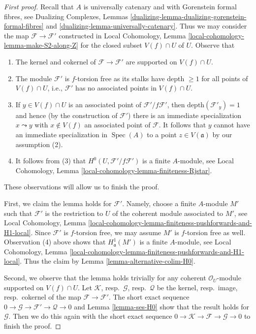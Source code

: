\documentclass{stacks-project}
\theoremstyle{plain}
\theoremstyle{definition}
\theoremstyle{remark}
\numberwithin{equation}{subsection}
\def\Spec{\mathop{\mathrm{Spec}}}
\begin{document}
\begin{proof}[First proof]
Recall that $A$ is universally catenary and with Gorenstein
formal fibres, see Dualizing Complexes, Lemmas
\ref{dualizing-lemma-dualizing-gorenstein-formal-fibres} and
\ref{dualizing-lemma-universally-catenary}. Thus we may consider the map
$\mathcal{F} \to \mathcal{F}'$ constructed in
Local Cohomology, Lemma \ref{local-cohomology-lemma-make-S2-along-Z}
for the closed subset $V(f) \cap U$ of $U$.
Observe that
\begin{enumerate}
\item The kernel and cokernel of $\mathcal{F} \to \mathcal{F}'$
are supported on $V(f) \cap U$.
\item The module $\mathcal{F}'$ is $f$-torsion free as its stalks have
depth $\geq 1$ for all points of $V(f) \cap U$, i.e., $\mathcal{F}'$
has no associated points in $V(f) \cap U$.
\item If $y \in V(f) \cap U$ is an associated point of
$\mathcal{F}'/f\mathcal{F}'$, then
$\text{depth}(\mathcal{F}'_y) = 1$
and hence (by the construction of $\mathcal{F}'$)
there is an immediate specialization $x \leadsto y$
with $x \not \in V(f)$ an associated point of $\mathcal{F}$.
It follows that $y$ cannot have
an immediate specialization in $\Spec(A)$
to a point $z \in V(\mathfrak a)$ by our assumption (2).
\item It follows from (3) that $H^0(U, \mathcal{F}'/f\mathcal{F}')$
is a finite $A$-module, see
Local Cohomology, Lemma \ref{local-cohomology-lemma-finiteness-Rjstar}.
\end{enumerate}
These observations will allow us to finish the proof.

\medskip\noindent
First, we claim the lemma holds for $\mathcal{F}'$.
Namely, choose a finite $A$-module $M'$ such that $\mathcal{F}'$
is the restriction
to $U$ of the coherent module associated to $M'$, see Local Cohomology,
Lemma \ref{local-cohomology-lemma-finiteness-pushforwards-and-H1-local}.
Since $\mathcal{F}'$ is $f$-torsion free, we may assume $M'$
is $f$-torsion free as well. Observation (4) above shows that
$H^1_\mathfrak a(M')$ is a finite $A$-module, see Local Cohomology,
Lemma \ref{local-cohomology-lemma-finiteness-pushforwards-and-H1-local}.
Thus the claim by Lemma \ref{lemma-alternative-colim-H0}.

\medskip\noindent
Second, we observe that the lemma holds trivially for any coherent
$\mathcal{O}_U$-module supported on $V(f) \cap U$.
Let $\mathcal{K}$, resp.\ $\mathcal{G}$, resp.\ $\mathcal{Q}$
be the kernel, resp.\ image, resp.\ cokernel of the map
$\mathcal{F} \to \mathcal{F}'$.
The short exact sequence
$0 \to \mathcal{G} \to \mathcal{F}' \to \mathcal{Q} \to 0$
and Lemma \ref{lemma-ses-H0} show that the result holds for
$\mathcal{G}$. Then we do this again with the short exact sequence
$0 \to \mathcal{K} \to \mathcal{F} \to \mathcal{G} \to 0$
to finish the proof.
\end{proof}
\end{document}
